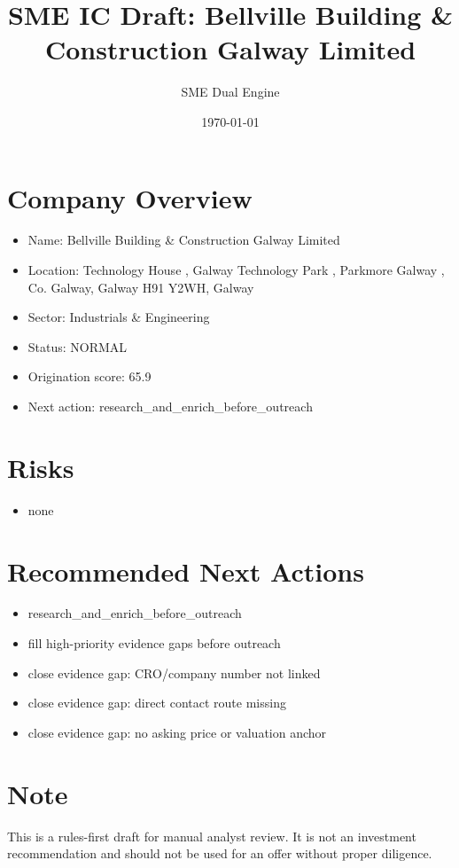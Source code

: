 \documentclass[11pt,a4paper]{article}
\title{SME IC Draft: Bellville Building \& Construction Galway Limited}
\author{SME Dual Engine}
\date{\today}
\begin{document}
\maketitle
\section*{Company Overview}
\begin{itemize}[leftmargin=1.4em]
\item Name: Bellville Building \& Construction Galway Limited
\item Location: Technology House , Galway Technology Park , Parkmore Galway , Co. Galway, Galway H91 Y2WH, Galway
\item Sector: Industrials \& Engineering
\item Status: NORMAL
\item Origination score: 65.9
\item Next action: research\_and\_enrich\_before\_outreach
\end{itemize}
\section*{Risks}
\begin{itemize}[leftmargin=1.4em]
\item none
\end{itemize}
\section*{Recommended Next Actions}
\begin{itemize}[leftmargin=1.4em]
\item research\_and\_enrich\_before\_outreach
\item fill high-priority evidence gaps before outreach
\item close evidence gap: CRO/company number not linked
\item close evidence gap: direct contact route missing
\item close evidence gap: no asking price or valuation anchor
\end{itemize}
\section*{Note}
This is a rules-first draft for manual analyst review. It is not an investment
recommendation and should not be used for an offer without proper diligence.
\end{document}
